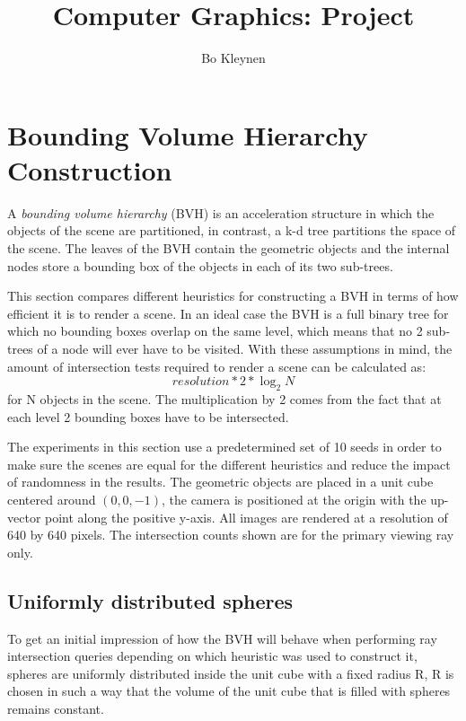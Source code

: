 \documentclass{article}
\title{Computer Graphics: Project}
\author{Bo Kleynen}
\begin{document}
\maketitle

\section{Bounding Volume Hierarchy Construction}
A \textit{bounding volume hierarchy} (BVH) is an acceleration structure in which the objects of the scene are partitioned, in contrast, a k-d tree partitions the space of the scene. The leaves of the BVH contain the geometric objects and the internal nodes store a bounding box of the objects in each of its two sub-trees.

This section compares different heuristics for constructing a BVH in terms of how efficient it is to render a scene. In an ideal case the BVH is a full binary tree for which no bounding boxes overlap on the same level, which means that no 2 sub-trees of a node will ever have to be visited. With these assumptions in mind, the amount of intersection tests required to render a scene can be calculated as:
\begin{equation}
resolution * 2 * \log_{2}{N}
\end{equation}
for N objects in the scene. The multiplication by 2 comes from the fact that at each level 2 bounding boxes have to be intersected.

The experiments in this section use a predetermined set of 10 seeds in order to make sure the scenes are equal for the different heuristics and reduce the impact of randomness in the results. The geometric objects are placed in a unit cube centered around $(0, 0, -1)$, the camera is positioned at the origin with the up-vector point along the positive y-axis. All images are rendered at a resolution of 640 by 640 pixels. The intersection counts shown are for the primary viewing ray only.


\subsection{Uniformly distributed spheres}
To get an initial impression of how the BVH will behave when performing ray intersection queries depending on which heuristic was used to construct it, spheres are uniformly distributed inside the unit cube with a fixed radius R, R is chosen in such a way that the volume of the unit cube that is filled with spheres remains constant.
\end{document}
